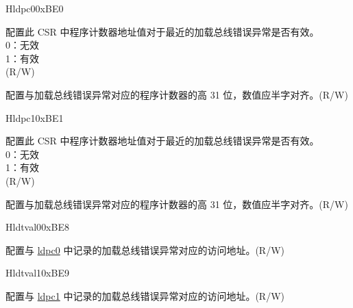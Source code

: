 \begin{register}{H}{ldpc0}{0xBE0}\label{regdesc:LDPC0}%
%
%
\regnewline%
\begin{regdesc}\begin{reglist}
\label{fielddesc:LDPC0_VLD}\item [VLD] 配置此 CSR 中程序计数器地址值对于最近的加载总线错误异常是否有效。\\
0：无效\\
1：有效\\
(R/W)
\label{fielddesc:LDPC0_ADDR}\item [ADDR] 配置与加载总线错误异常对应的程序计数器的高 31 位，数值应半字对齐。(R/W)
\end{reglist}\end{regdesc}
\end{register}

\begin{register}{H}{ldpc1}{0xBE1}\label{regdesc:LDPC1}%
%
%
\regnewline%
\begin{regdesc}\begin{reglist}
\label{fielddesc:LDPC1_VLD}\item [VLD]  配置此 CSR 中程序计数器地址值对于最近的加载总线错误异常是否有效。\\
0：无效\\
1：有效\\
(R/W)
\label{fielddesc:LDPC1_ADDR}\item [ADDR] 配置与加载总线错误异常对应的程序计数器的高 31 位，数值应半字对齐。(R/W)
\end{reglist}\end{regdesc}
\end{register}

\begin{register}{H}{ldtval0}{0xBE8}\label{regdesc:LDTVAL0}%
%
\regnewline%
\begin{regdesc}\begin{reglist}
\label{fielddesc:LDTVAL0_ADDR}\item [ADDR] 配置与 \hyperref[regdesc:LDPC0]{ldpc0} 中记录的加载总线错误异常对应的访问地址。(R/W)
\end{reglist}\end{regdesc}
\end{register}

\begin{register}{H}{ldtval1}{0xBE9}\label{regdesc:LDTVAL1}%
%
\regnewline%
\begin{regdesc}\begin{reglist}
\label{fielddesc:LDTVAL1_ADDR}\item [ADDR] 配置与 \hyperref[regdesc:LDPC1]{ldpc1} 中记录的加载总线错误异常对应的访问地址。(R/W)
\end{reglist}\end{regdesc}
\end{register}

